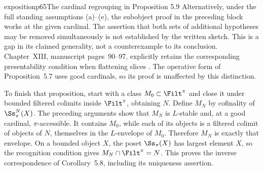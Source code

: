 \begin{dcomment}{exposition}{p65}{The cardinal regrouping in Proposition 5.9}
Alternatively, under the full standing assumptions (a)--(e), the subobject proof in the preceding block works at the given cardinal. The assertion that both sets of additional hypotheses may be removed simultaneously is not established by the written sketch. This is a gap in its claimed generality, not a counterexample to its conclusion. Chapter~XIII, manuscript pages~90--97, explicitly retains the corresponding presentability condition when flattening slices \citep{Grothendieck1990XIII}. The operative form of Proposition~5.7 uses good cardinals, so its proof is unaffected by this distinction.

To finish that proposition, start with a class $M_0\subset\Filt^\pi$ and close it under bounded filtered colimits inside $\Filt^\pi$, obtaining $N$. Define $M_N$ by cofinality of $\Ss_\pi^N(X)$. The preceding arguments show that $M_N$ is $L$-stable and, at a good cardinal, $\pi$-accessible. It contains $M_0$, while each of its objects is a filtered colimit of objects of $N$, themselves in the $L$-envelope of $M_0$. Therefore $M_N$ is exactly that envelope. On a bounded object $X$, the poset $\Ss_\pi(X)$ has largest element $X$, so the recognition condition gives $M_N\cap\Filt^\pi=N$. This proves the inverse correspondence of Corollary~5.8, including its uniqueness assertion.
\end{dcomment}

